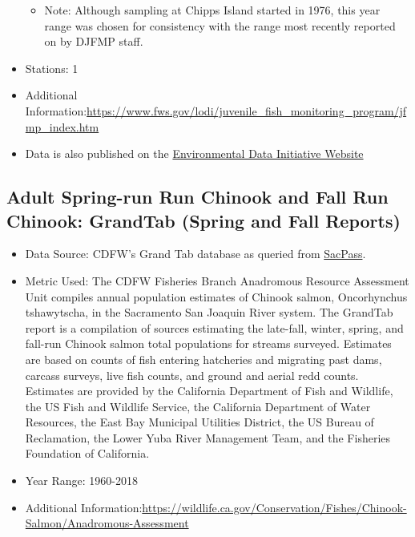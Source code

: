 \documentclass[
]{book}
\providecommand{\tightlist}{%
  \setlength{\itemsep}{0pt}\setlength{\parskip}{0pt}}
\begin{document}
\begin{itemize}
  \begin{itemize}
  \tightlist
  \item
    Note: Although sampling at Chipps Island started in 1976, this year range was chosen for consistency with the range most recently reported on by DJFMP staff.
  \end{itemize}
\item
  Stations: 1
\item
  Additional Information:\url{https://www.fws.gov/lodi/juvenile_fish_monitoring_program/jfmp_index.htm}
\item
  Data is also published on the \href{https://portal.edirepository.org/nis/mapbrowse?packageid=edi.244.4}{Environmental Data Initiative Website}
\end{itemize}

\hypertarget{adult-spring-run-run-chinook-and-fall-run-chinook-grandtab-spring-and-fall-reports}{%
\subsection{Adult Spring-run Run Chinook and Fall Run Chinook: GrandTab (Spring and Fall Reports)}\label{adult-spring-run-run-chinook-and-fall-run-chinook-grandtab-spring-and-fall-reports}}

\begin{itemize}
\tightlist
\item
  Data Source: CDFW's Grand Tab database as queried from \href{http://www.cbr.washington.edu/sacramento/data/query_adult_grandtab.html}{SacPass}.
\item
  Metric Used: The CDFW Fisheries Branch Anadromous Resource Assessment Unit compiles annual population estimates of Chinook salmon, Oncorhynchus tshawytscha, in the Sacramento San Joaquin River system. The GrandTab report is a compilation of sources estimating the late-fall, winter, spring, and fall-run Chinook salmon total populations for streams surveyed. Estimates are based on counts of fish entering hatcheries and migrating past dams, carcass surveys, live fish counts, and ground and aerial redd counts. Estimates are provided by the California Department of Fish and Wildlife, the US Fish and Wildlife Service, the California Department of Water Resources, the East Bay Municipal Utilities District, the US Bureau of Reclamation, the Lower Yuba River Management Team, and the Fisheries Foundation of California.
\item
  Year Range: 1960-2018
\item
  Additional Information:\url{https://wildlife.ca.gov/Conservation/Fishes/Chinook-Salmon/Anadromous-Assessment}
\end{itemize}
\end{document}
